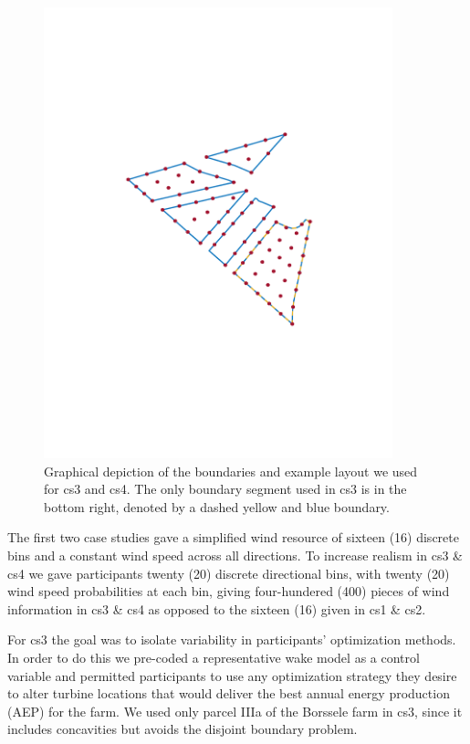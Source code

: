 \begin{figure}
\begin{minipage}{0.45\textwidth}
		\includegraphics[width=0.9\textwidth, trim=0.8in 2.5in 1.0in 2.9in, clip]{./figures/cs4-layout.pdf} %
		\caption{Graphical depiction of the boundaries and example layout we used for cs3 and cs4. The only boundary segment used in cs3 is in the bottom right, denoted by a dashed yellow and blue boundary.}
		\label{fig:ex4}
	\end{minipage}
\end{figure}

The first two case studies gave a simplified wind resource of sixteen (16) discrete bins and a constant wind speed across all directions.
To increase realism in cs3 \& cs4 we gave participants twenty (20) discrete directional bins, with twenty (20) wind speed probabilities at each bin, giving four-hundered (400) pieces of wind information in cs3 \& cs4 as opposed to the sixteen (16) given in cs1 \& cs2.

For cs3 the goal was to isolate variability in participants' optimization methods.
In order to do this we pre-coded a representative wake model as a control variable and permitted participants to use any optimization strategy they desire to alter turbine locations that would deliver the best annual energy production (AEP) for the farm.
We used only parcel IIIa of the Borssele farm in cs3, since it includes concavities but avoids the disjoint boundary problem.

